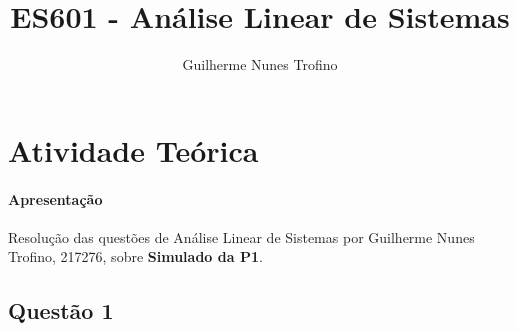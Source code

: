\documentclass{article}
\title{ES601 - Análise Linear de Sistemas}
\author{Guilherme Nunes Trofino}
\begin{document}
    \maketitle
\newpage

    \section{Atividade Teórica}
        \paragraph{Apresentação}Resolução das questões de Análise Linear de Sistemas por Guilherme Nunes Trofino, 217276, sobre \textbf{Simulado da P1}.

        \subsection{Questão 1}
\end{document}

